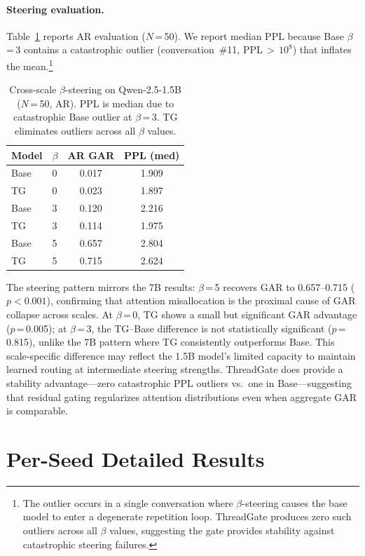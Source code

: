 \paragraph{Steering evaluation.} Table~\ref{tab:1.5b-steering} reports AR evaluation ($N$\,=\,50). We report median PPL because Base $\beta$\,=\,3 contains a catastrophic outlier (conversation~\#11, PPL\,$>$\,$10^8$) that inflates the mean.\footnote{The outlier occurs in a single conversation where $\beta$-steering causes the base model to enter a degenerate repetition loop. ThreadGate produces zero such outliers across all $\beta$ values, suggesting the gate provides stability against catastrophic steering failures.}

\begin{table}[t]
\centering\small
\caption{Cross-scale $\beta$-steering on Qwen-2.5-1.5B ($N$\,=\,50, AR). PPL is median due to catastrophic Base outlier at $\beta$\,=\,3. TG eliminates outliers across all $\beta$ values.}
\label{tab:1.5b-steering}
\begin{tabular}{llcc}
\toprule
\textbf{Model} & $\beta$ & \textbf{AR GAR} & \textbf{PPL (med)} \\
\midrule
Base & 0 & 0.017 & 1.909 \\
TG & 0 & 0.023 & 1.897 \\
\midrule
Base & 3 & 0.120 & 2.216 \\
TG & 3 & 0.114 & 1.975 \\
\midrule
Base & 5 & 0.657 & 2.804 \\
TG & 5 & 0.715 & 2.624 \\
\bottomrule
\end{tabular}
\end{table}

The steering pattern mirrors the 7B results: $\beta$\,=\,5 recovers GAR to 0.657--0.715 ($p < 0.001$), confirming that attention misallocation is the proximal cause of GAR collapse across scales. At $\beta$\,=\,0, TG shows a small but significant GAR advantage ($p$\,=\,0.005); at $\beta$\,=\,3, the TG--Base difference is not statistically significant ($p$\,=\,0.815), unlike the 7B pattern where TG consistently outperforms Base. This scale-specific difference may reflect the 1.5B model's limited capacity to maintain learned routing at intermediate steering strengths. ThreadGate does provide a stability advantage---zero catastrophic PPL outliers vs.\ one in Base---suggesting that residual gating regularizes attention distributions even when aggregate GAR is comparable.

\section{Per-Seed Detailed Results}\label{sec:appendix-perseed}

